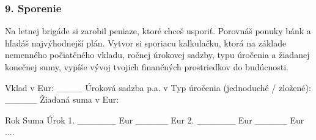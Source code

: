 \subsubsection*{9. Sporenie}
Na letnej brigáde si zarobil peniaze, ktoré chceš usporiť. Porovnáš ponuky bánk a hľadáš najvýhodnejší plán. Vytvor si sporiacu kalkulačku, ktorá na základe nemenného počiatčného vkladu, ročnej úrokovej sadzby, typu úročenia a žiadanej konečnej sumy, vypíše vývoj tvojich finančných prostriedkov do budúcnosti.

\begin{code}
Vklad v Eur: ____
Úroková sadzba p.a. v %
Typ úročenia (jednoduché / zložené): _____
Žiadaná suma v Eur:

Rok      Suma         Úrok
  1.	     ______ Eur   _____ Eur
  2.     ______ Eur   _____ Eur
....
\end{code} 

